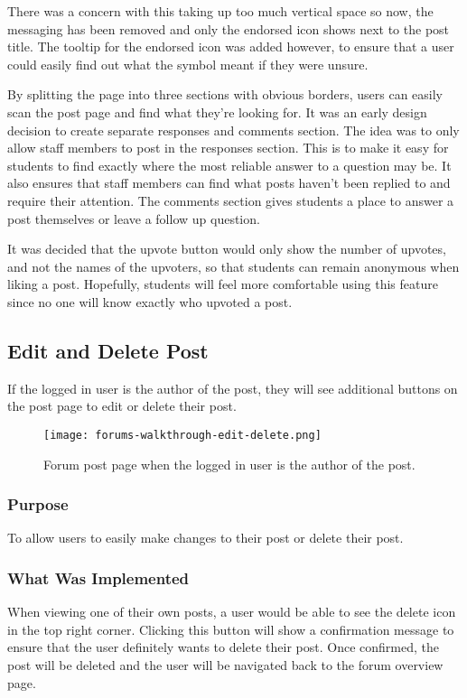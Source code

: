 There was a concern with this taking up too much vertical space so now, the messaging has been removed and only the endorsed icon shows next to the post title.
The tooltip for the endorsed icon was added however, to ensure that a user could easily find out what the symbol meant if they were unsure.

By splitting the page into three sections with obvious borders, users can easily scan the post page and find what they're looking for.
It was an early design decision to create separate responses and comments section.
The idea was to only allow staff members to post in the responses section.
This is to make it easy for students to find exactly where the most reliable answer to a question may be.
It also ensures that staff members can find what posts haven't been replied to and require their attention.
The comments section gives students a place to answer a post themselves or leave a follow up question.

It was decided that the upvote button would only show the number of upvotes, and not the names of the upvoters, so that students can remain anonymous when liking a post.
Hopefully, students will feel more comfortable using this feature since no one will know exactly who upvoted a post.

\newpage

\subsection{Edit and Delete Post}
If the logged in user is the author of the post, they will see additional buttons on the post page to edit or delete their post.

\begin{figure}[h!]
    \texttt{[image: forums-walkthrough-edit-delete.png]}
    \centering
    \caption{Forum post page when the logged in user is the author of the post.}
\end{figure}

\subsubsection{Purpose}
To allow users to easily make changes to their post or delete their post.

\subsubsection{What Was Implemented}
When viewing one of their own posts, a user would be able to see the delete icon in the top right corner.
Clicking this button will show a confirmation message to ensure that the user definitely wants to delete their post.
Once confirmed, the post will be deleted and the user will be navigated back to the forum overview page.

